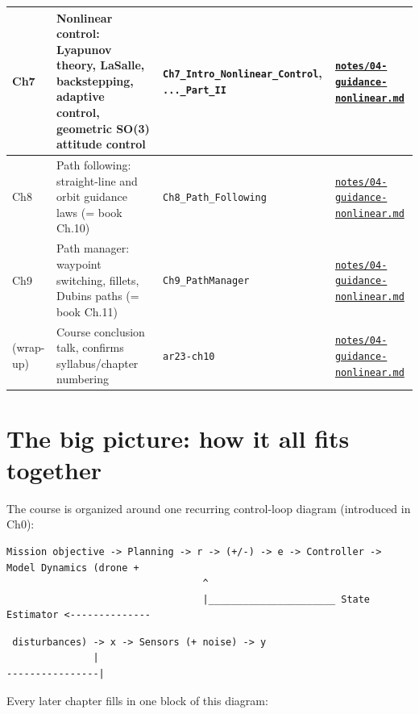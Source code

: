 \documentclass[11pt]{article}
\begin{document}
\begin{center}
\begin{longtable}{|p{1.32cm}|p{6.05cm}|p{4.16cm}|p{3.66cm}|}
\hline
Ch7 & Nonlinear control: Lyapunov theory, LaSalle, backstepping, adaptive control, geometric SO(3) attitude control & \texttt{Ch7\_\allowbreak{}Intro\_\allowbreak{}Nonlinear\_\allowbreak{}Control}, \texttt{...\_\allowbreak{}Part\_\allowbreak{}II} & \href{notes/04-guidance-nonlinear.pdf}{\texttt{notes/04-guidance-nonlinear.md}} \\
\hline
Ch8 & Path following: straight-line and orbit guidance laws (= book Ch.10) & \texttt{Ch8\_\allowbreak{}Path\_\allowbreak{}Following} & \href{notes/04-guidance-nonlinear.pdf}{\texttt{notes/04-guidance-nonlinear.md}} \\
\hline
Ch9 & Path manager: waypoint switching, fillets, Dubins paths (= book Ch.11) & \texttt{Ch9\_\allowbreak{}PathManager} & \href{notes/04-guidance-nonlinear.pdf}{\texttt{notes/04-guidance-nonlinear.md}} \\
\hline
(wrap-up) & Course conclusion talk, confirms syllabus/chapter numbering & \texttt{ar23-ch10} & \href{notes/04-guidance-nonlinear.pdf}{\texttt{notes/04-guidance-nonlinear.md}} \\
\hline
\end{longtable}
\end{center}

\section{The big picture: how it all fits together}

The course is organized around one recurring control-loop diagram (introduced in Ch0):

\scriptsize
\begin{verbatim}
Mission objective -> Planning -> r -> (+/-) -> e -> Controller -> Model Dynamics (drone +
                                  ^                                                      
                                  |______________________ State Estimator <--------------
\end{verbatim}
\begin{verbatim}
 disturbances) -> x -> Sensors (+ noise) -> y
               |
----------------|
\end{verbatim}
\normalsize

Every later chapter fills in one block of this diagram:
\end{document}

